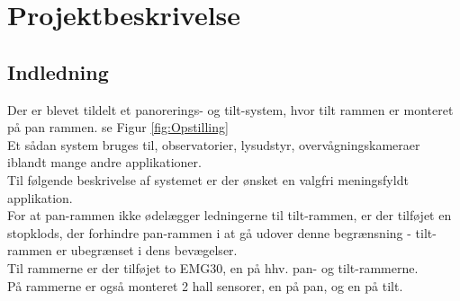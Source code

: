\section{Projektbeskrivelse}

\subsection{Indledning}
Der er blevet tildelt et panorerings- og tilt-system, hvor tilt rammen er monteret på pan rammen. se Figur \ref{fig:Opstilling}\\
Et sådan system bruges til, observatorier, lysudstyr, overvågningskameraer iblandt mange andre applikationer.\\
Til følgende beskrivelse af systemet er der ønsket en valgfri meningsfyldt applikation.\\
For at pan-rammen ikke ødelægger ledningerne til tilt-rammen, er der tilføjet en stopklods, der forhindre pan-rammen i at gå udover denne begrænsning - tilt-rammen er ubegrænset i dens bevægelser.\\
Til rammerne er der tilføjet to EMG30\cite{emg30Data}, en på hhv. pan- og tilt-rammerne.\\
På rammerne er også monteret 2 hall sensorer, en på pan, og en på tilt. 


